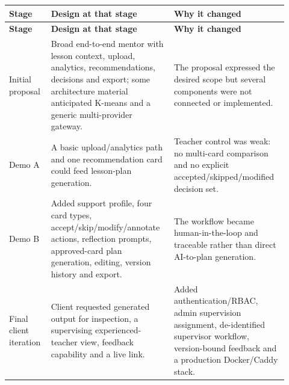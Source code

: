 \documentclass[11pt,a4paper]{article}
\begin{document}
\begin{small}

\setlength{\tabcolsep}{3pt}

\begin{longtable}{>{\raggedright\arraybackslash}p{0.147\linewidth}>{\raggedright\arraybackslash}p{0.383\linewidth}>{\raggedright\arraybackslash}p{0.389\linewidth}}

\hline

\textbf{Stage} & \textbf{Design at that stage} & \textbf{Why it changed} \\ \hline

\endfirsthead

\hline

\textbf{Stage} & \textbf{Design at that stage} & \textbf{Why it changed} \\ \hline

\endhead

Initial proposal & Broad end-to-end mentor with lesson context, upload, analytics, recommendations, decisions and export; some architecture material anticipated K-means and a generic multi-provider gateway. & The proposal expressed the desired scope but several components were not connected or implemented. \\ \hline

Demo A & A basic upload/\allowbreak{}analytics path and one recommendation card could feed lesson-plan generation. & Teacher control was weak: no multi-card comparison and no explicit accepted/\allowbreak{}skipped/\allowbreak{}modified decision set. \\ \hline

Demo B & Added support profile, four card types, accept/\allowbreak{}skip/\allowbreak{}modify/\allowbreak{}annotate actions, reflection prompts, approved-card plan generation, editing, version history and export. & The workflow became human-in-the-loop and traceable rather than direct AI-to-plan generation. \\ \hline

Final client iteration & Client requested generated output for inspection, a supervising experienced-teacher view, feedback capability and a live link. & Added authentication/\allowbreak{}RBAC, admin supervision assignment, de-identified supervisor workflow, version-bound feedback and a production Docker/\allowbreak{}Caddy stack. \\ \hline

\end{longtable}

\end{small}
\end{document}
